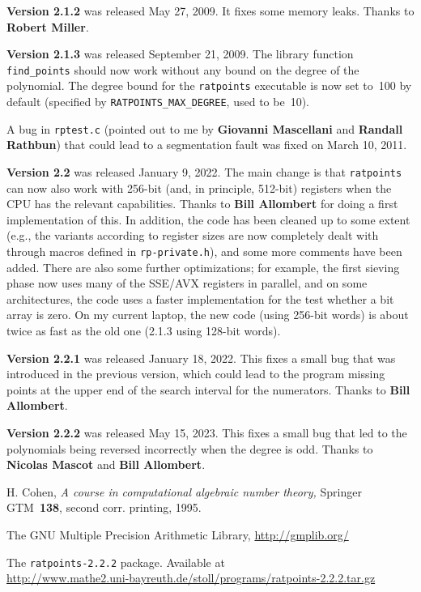 \documentclass[12pt,a4paper,oneside]{amsart}
\newcommand{\rpversion}{2.2.2} %
\begin{document}
\textbf{Version 2.1.2} was released May 27, 2009. It fixes some memory leaks.
Thanks to \textbf{Robert Miller}.

\textbf{Version 2.1.3} was released September 21, 2009. The library function
\verb+find_points+ should now work without any bound on the degree of the
polynomial. The degree bound for the \texttt{ratpoints} executable is now set
to~100 by default (specified by \verb+RATPOINTS_MAX_DEGREE+, used to be~10).

A bug in \texttt{rptest.c} (pointed out to me by \textbf{Giovanni Mascellani}
and \textbf{Randall Rathbun}) that could lead to a segmentation fault was fixed on
March 10, 2011.

\textbf{Version 2.2} was released January 9, 2022. The main change is that
\texttt{ratpoints} can now also work with 256-bit (and, in principle, 512-bit)
registers when the CPU has the relevant capabilities. Thanks to
\textbf{Bill Allombert} for doing a first implementation of this. In addition,
the code has been cleaned up to some extent (e.g., the variants according
to register sizes are now completely dealt with through macros defined
in \texttt{rp-private.h}), and some more comments have been added.
There are also some further optimizations; for example, the first sieving
phase now uses many of the SSE/AVX registers in parallel, and on some
architectures, the code uses a faster implementation for the test whether
a bit array is zero. On my current laptop, the new code (using 256-bit words)
is about twice as fast as the old one (2.1.3 using 128-bit words).

\textbf{Version 2.2.1} was released January 18, 2022. This fixes a small
bug that was introduced in the previous version, which could lead to
the program missing points at the upper end of the search interval
for the numerators. Thanks to \textbf{Bill Allombert}.

\textbf{Version 2.2.2} was released May 15, 2023. This fixes a small
bug that led to the polynomials being reversed incorrectly when the
degree is odd. Thanks to \textbf{Nicolas Mascot} and \textbf{Bill Allombert}.


\begin{thebibliography}{gmp}
\frenchspacing

  H. Cohen, \textit{A course in computational algebraic number theory,}
  Springer GTM~\textbf{138}, second corr. printing, 1995.

  The GNU Multiple Precision Arithmetic Library, \url{http://gmplib.org/}

  The \texttt{ratpoints-\rpversion} package. Available at \\
  \url{http://www.mathe2.uni-bayreuth.de/stoll/programs/ratpoints-\rpversion.tar.gz}

\end{thebibliography}
\end{document}
